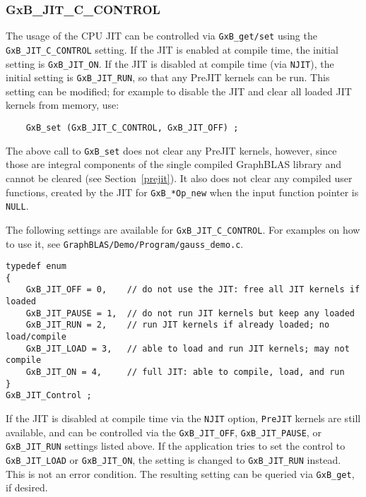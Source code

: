 \documentclass[12pt]{article}
\begin{document}
\subsubsection{\sf GxB\_JIT\_C\_CONTROL}

The usage of the CPU JIT can be controlled via \verb'GxB_get/set' using the
\verb'GxB_JIT_C_CONTROL' setting.  If the JIT is enabled at compile time, the
initial setting is \verb'GxB_JIT_ON'.  If the JIT is disabled at compile time
(via \verb'NJIT'), the initial setting is \verb'GxB_JIT_RUN', so that any
PreJIT kernels can be run.  This setting can be modified; for example to
disable the JIT and clear all loaded JIT kernels from memory, use:

\begin{verbatim}
    GxB_set (GxB_JIT_C_CONTROL, GxB_JIT_OFF) ;
\end{verbatim}

The above call to \verb'GxB_set' does not clear any PreJIT kernels, however,
since those are integral components of the single compiled GraphBLAS library
and cannot be cleared (see Section~\ref{prejit}).  It also does not clear any
compiled user functions, created by the JIT for \verb'GxB_*Op_new' when the
input function pointer is \verb'NULL'.

The following settings are available for \verb'GxB_JIT_C_CONTROL'.
For examples on how to use it, see
\verb'GraphBLAS/Demo/Program/gauss_demo.c'.

{\footnotesize
\begin{verbatim}
typedef enum
{
    GxB_JIT_OFF = 0,    // do not use the JIT: free all JIT kernels if loaded
    GxB_JIT_PAUSE = 1,  // do not run JIT kernels but keep any loaded
    GxB_JIT_RUN = 2,    // run JIT kernels if already loaded; no load/compile
    GxB_JIT_LOAD = 3,   // able to load and run JIT kernels; may not compile
    GxB_JIT_ON = 4,     // full JIT: able to compile, load, and run
}
GxB_JIT_Control ;
\end{verbatim} }

If the JIT is disabled at compile time via the \verb'NJIT' option,
\verb'PreJIT' kernels are still available, and can be controlled via the
\verb'GxB_JIT_OFF', \verb'GxB_JIT_PAUSE', or \verb'GxB_JIT_RUN' settings
listed above.  If the application tries to set the control to
\verb'GxB_JIT_LOAD' or \verb'GxB_JIT_ON', the setting is changed to
\verb'GxB_JIT_RUN' instead.  This is not an error condition.  The resulting
setting can be queried via \verb'GxB_get', if desired.
\end{document}
